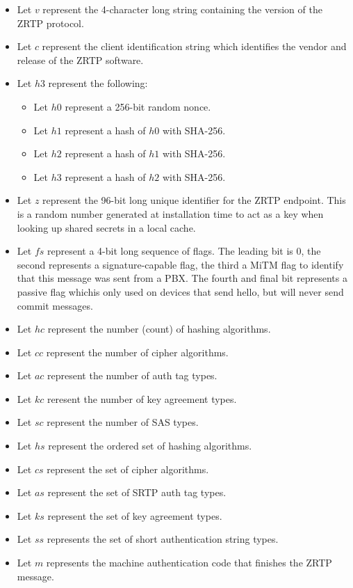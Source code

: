 \documentclass[11pt]{article}
\begin{document}
  \begin{itemize}
    \item Let $v$ represent the 4-character long string containing 
          the version of the ZRTP protocol.
    \item Let $c$ represent the client identification string which
          identifies the vendor and release of the ZRTP software.
    \item Let $h3$ represent the following:
       \begin{itemize}
       \item Let $h0$ represent a 256-bit random nonce.
       \item Let $h1$ represent a hash of $h0$ with SHA-256.
       \item Let $h2$ represent a hash of $h1$ with SHA-256.
       \item Let $h3$ represent a hash of $h2$ with SHA-256.
       \end{itemize}
    \item Let $z$ represent the 96-bit long unique identifier for 
          the ZRTP endpoint. This is a random number generated at 
          installation time to act as a key when looking up 
          shared secrets in a local cache.
    \item Let $fs$ represent a 4-bit long sequence of flags. 
          The leading bit is 0, the second represents a 
          signature-capable flag, the third a MiTM flag to 
          identify that this message was sent from a PBX. The 
          fourth and final bit represents a passive flag 
          whichis only used on devices that send hello, 
          but will never send commit messages.
    \item Let $hc$ represent the number (count) of hashing 
            algorithms.
    \item Let $cc$ represent the number of cipher algorithms.
    \item Let $ac$ represent the number of auth tag types.
    \item Let $kc$ reresent the number of key agreement types.
    \item Let $sc$ represent the number of SAS types.
    \item Let $hs$ represent the ordered set of hashing algorithms.
    \item Let $cs$ represent the set of cipher algorithms.
    \item Let $as$ represent the set of SRTP auth tag types.
    \item Let $ks$ represent the set of key agreement types.
    \item Let $ss$ represents the set of short authentication 
          string types.
    \item Let $m$ represents the machine authentication code 
          that finishes the ZRTP message.
  \end{itemize}
\end{document}
